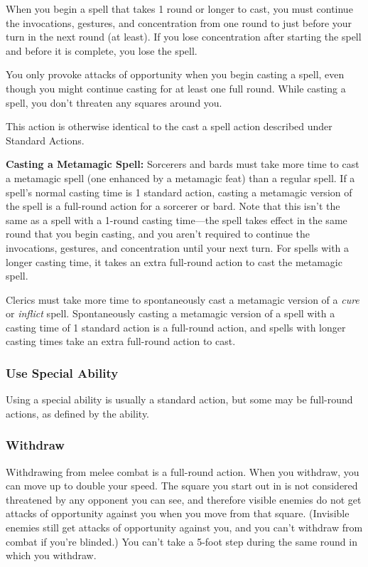 \documentclass{article}
\begin{document}
When you begin a spell that takes 1 round or longer to cast, you must continue 
the invocations, gestures, and concentration from one round to just before your 
turn in the next round (at least). If you lose concentration after starting the 
spell and before it is complete, you lose the spell.

You only provoke attacks of opportunity when you begin casting a spell, even though 
you might continue casting for at least one full round. While casting a spell, 
you don't threaten any squares around you.

This action is otherwise identical to the cast a spell action described under Standard 
Actions.

\textbf{Casting a Metamagic Spell:} Sorcerers and bards must take more time to 
cast a metamagic spell (one enhanced by a metamagic feat) than a regular spell. 
If a spell's normal casting time is 1 standard action, casting a metamagic version 
of the spell is a full-round action for a sorcerer or bard. Note that this isn't 
the same as a spell with a 1-round casting time---the spell takes effect in the 
same round that you begin casting, and you aren't required to continue the invocations, 
gestures, and concentration until your next turn. For spells with a longer casting 
time, it takes an extra full-round action to cast the metamagic spell.

Clerics must take more time to spontaneously cast a metamagic version of a \textit{cure 
}or \textit{inflict }spell.\textit{ }Spontaneously casting a metamagic version 
of a spell with a casting time of 1 standard action is a full-round action, and 
spells with longer casting times take an extra full-round action to cast.

\vspace{12pt}
\subsubsection*{\textbf{Use Special Ability}}

Using a special ability is usually a standard action, but some may be full-round 
actions, as defined by the ability.

\vspace{12pt}
\subsubsection*{\textbf{Withdraw}}

Withdrawing from melee combat is a full-round action. When you withdraw, you can 
move up to double your speed. The square you start out in is not considered threatened 
by any opponent you can see, and therefore visible enemies do not get attacks of 
opportunity against you when you move from that square. (Invisible enemies still 
get attacks of opportunity against you, and you can't withdraw from combat if you're 
blinded.) You can't take a 5-foot step during the same round in which you withdraw.
\end{document}
